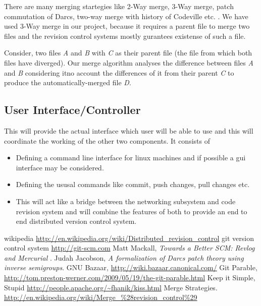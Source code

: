 \documentclass[12pt]{article}
\begin{document}
There are many merging startegies like 2-Way merge, 3-Way merge, patch commutation of Darcs,  two-way merge with history of Codeville etc. \cite{WIKIMERGE}.
We have used 3-Way merge in our project, because it requires a parent file to merge two files and the revision control systems mostly gurantees existense of such a file.

Consider, two files \emph{A} and \emph{B} with \emph{C} as their parent file (the file from which both files have diverged). Our merge algorithm analyses the difference between files \emph{A} and \emph{B} considering itno account the differences of it from their parent \emph{C} to produce the automatically-merged file \emph{D}. 

\subsection{User Interface/Controller}
This will provide the actual interface which user will be able to use and this
will coordinate the working of the other two components.
It consists of
\begin{itemize}
\item Defining a command line interface for linux machines and if possible a
  gui interface may be considered.
\item Defining the ususal commands like commit, push changes, pull changes
  etc.
\item This will act like a bridge between the networking subsystem and code
  revision system and will combine the features of both to provide an end to
  end distributed version control system.
\end{itemize}

\begin{thebibliography}{99}
wikipedia \url{http://en.wikipedia.org/wiki/Distributed_revision_control}
git version control system \url{http://git-scm.com}
Matt Mackall, \emph{Towards a Better SCM: Revlog and Mercurial} .
Judah Jacobson, \emph{A formalization of Darcs patch theory using inverse
  semigroups}.
GNU Bazaar, \url{http://wiki.bazaar.canonical.com/}
Git Parable,
\url{http://tom.preston-werner.com/2009/05/19/the-git-parable.html}
Keep it Simple, Stupid
\url{http://people.apache.org/~fhanik/kiss.html}
Merge Strategies.
\url{http://en.wikipedia.org/wiki/Merge_%28revision_control%29}
\end{thebibliography}
\end{document}
